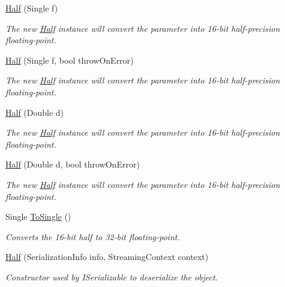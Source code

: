 \begin{DoxyCompactItemize}
\item 
\hyperlink{struct_open_t_k_1_1_half_aa17fec8711c6b77969fdf435aaeec5d7}{Half} (Single f)
\begin{DoxyCompactList}\small\item\em The new \hyperlink{struct_open_t_k_1_1_half}{Half} instance will convert the parameter into 16-\/bit half-\/precision floating-\/point. \end{DoxyCompactList}\item 
\hyperlink{struct_open_t_k_1_1_half_a4301c75f075d2e1cb1f5462e82cb0176}{Half} (Single f, bool throw\-On\-Error)
\begin{DoxyCompactList}\small\item\em The new \hyperlink{struct_open_t_k_1_1_half}{Half} instance will convert the parameter into 16-\/bit half-\/precision floating-\/point. \end{DoxyCompactList}\item 
\hyperlink{struct_open_t_k_1_1_half_aaa413e6314d445002990c1c44acc8fc4}{Half} (Double d)
\begin{DoxyCompactList}\small\item\em The new \hyperlink{struct_open_t_k_1_1_half}{Half} instance will convert the parameter into 16-\/bit half-\/precision floating-\/point. \end{DoxyCompactList}\item 
\hyperlink{struct_open_t_k_1_1_half_ac3687a82ee851cb0a9878c9f3177c377}{Half} (Double d, bool throw\-On\-Error)
\begin{DoxyCompactList}\small\item\em The new \hyperlink{struct_open_t_k_1_1_half}{Half} instance will convert the parameter into 16-\/bit half-\/precision floating-\/point. \end{DoxyCompactList}\item 
Single \hyperlink{struct_open_t_k_1_1_half_ad3447d0a7cdbd8a76afee7ae923aef2f}{To\-Single} ()
\begin{DoxyCompactList}\small\item\em Converts the 16-\/bit half to 32-\/bit floating-\/point.\end{DoxyCompactList}\item 
\hyperlink{struct_open_t_k_1_1_half_a44a3570c428b6ba6049968545a90d971}{Half} (Serialization\-Info info, Streaming\-Context context)
\begin{DoxyCompactList}\small\item\em Constructor used by I\-Serializable to deserialize the object.\end{DoxyCompactList}\item 

\end{DoxyCompactItemize}
